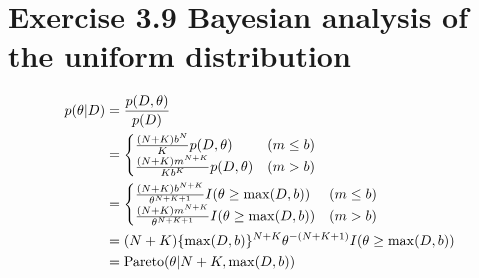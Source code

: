 \documentclass{jsarticle}
\begin{document}
\section*{Exercise 3.9 Bayesian analysis of the uniform distribution}
\begin{align}
p(\theta|D) & = \frac{p(D,\theta)}{p(D)}\\
& = \begin{cases}
\frac{(N+K)b^N}{K}p(D,\theta) & (m \leq b) \\
\frac{(N+K)m^{N+K}}{Kb^K}p(D, \theta) & (m > b)
\end{cases} \\
& = \begin{cases}
\frac{(N+K)b^{N+K}}{\theta^{N+K+1}}I(\theta \geq \max(D,b)) & (m \leq b)\\
\frac{(N+K)m^{N+K}}{\theta^{N+K+1}}I(\theta \geq \max(D,b)) & (m > b)
\end{cases}\\
& = (N+K)\{\max(D,b) \}^{N+K}\theta^{-(N+K+1)}I(\theta \geq \max (D,b)) \\
& = {\rm Pareto}(\theta|N+K,\max(D,b))
\end{align}
\end{document}

